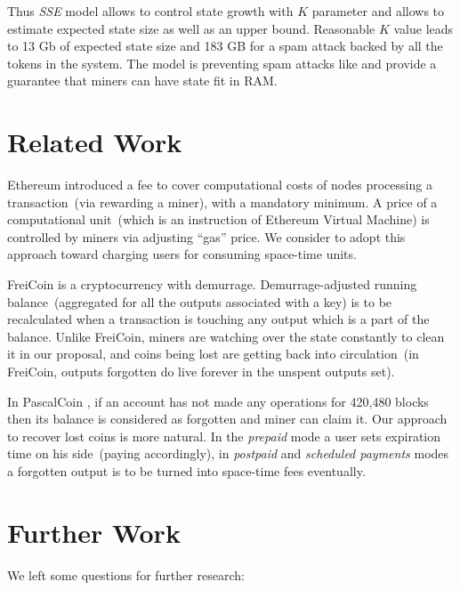 \documentclass[]{llncs}   %
\newcommand{\esse}{\textit{SSE}}
\begin{document}
Thus \esse{} model allows to control state growth with $K$ parameter and allows to estimate expected state size as well as an upper bound. Reasonable $K$ value leads to 13 Gb of expected state size and 183 GB for a spam attack backed by all the tokens in the system. The model is preventing spam attacks like \cite{bitcoin2015flood} and provide a guarantee that miners can have state fit in RAM.

\section{Related Work}

Ethereum\cite{ethyp} introduced a fee to cover computational costs of nodes processing a transaction~(via rewarding a miner), with a mandatory minimum. A price of a computational unit~(which is an instruction of Ethereum Virtual Machine) is controlled by miners via adjusting ``gas'' price. We consider to adopt this approach toward charging users for consuming space-time units.

FreiCoin\cite{freicoin} is a cryptocurrency with demurrage. Demurrage-adjusted running balance~(aggregated for all the outputs associated with a key) is to be recalculated when a transaction is touching any output which is a part of the balance. Unlike FreiCoin, miners are watching over the state constantly to clean it in our proposal, and coins being lost are getting back into circulation~(in FreiCoin, outputs forgotten do live forever in the unspent outputs set).

In PascalCoin \cite{pascalCoin}, if an account has not made any operations for 420,480 blocks then its balance is considered as forgotten and miner can claim it. Our approach to recover lost coins is more natural. In the \textit{prepaid} mode a user sets expiration time on his side~(paying accordingly), in \textit{postpaid} and \textit{scheduled payments} modes a forgotten output is to be turned into space-time fees eventually.

\section{Further Work}

We left some questions for further research:
\end{document}
